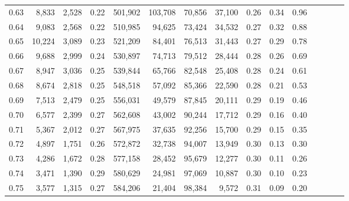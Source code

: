 \begin{tabular}{rrrcrrrrrrrrrrr}
0.63 &   8,833 &  2,528 &                                       0.22 &  501,902 &  103,708 &   70,856 &   37,100 &  0.26 &  0.34 &                         0.96 \\
0.64 &   9,083 &  2,568 &                                       0.22 &  510,985 &   94,625 &   73,424 &   34,532 &  0.27 &  0.32 &                         0.88 \\
0.65 &  10,224 &  3,089 &                                       0.23 &  521,209 &   84,401 &   76,513 &   31,443 &  0.27 &  0.29 &                         0.78 \\
0.66 &   9,688 &  2,999 &                                       0.24 &  530,897 &   74,713 &   79,512 &   28,444 &  0.28 &  0.26 &                         0.69 \\
0.67 &   8,947 &  3,036 &                                       0.25 &  539,844 &   65,766 &   82,548 &   25,408 &  0.28 &  0.24 &                         0.61 \\
0.68 &   8,674 &  2,818 &                                       0.25 &  548,518 &   57,092 &   85,366 &   22,590 &  0.28 &  0.21 &                         0.53 \\
0.69 &   7,513 &  2,479 &                                       0.25 &  556,031 &   49,579 &   87,845 &   20,111 &  0.29 &  0.19 &                         0.46 \\
0.70 &   6,577 &  2,399 &                                       0.27 &  562,608 &   43,002 &   90,244 &   17,712 &  0.29 &  0.16 &                         0.40 \\
0.71 &   5,367 &  2,012 &                                       0.27 &  567,975 &   37,635 &   92,256 &   15,700 &  0.29 &  0.15 &                         0.35 \\
0.72 &   4,897 &  1,751 &                                       0.26 &  572,872 &   32,738 &   94,007 &   13,949 &  0.30 &  0.13 &                         0.30 \\
0.73 &   4,286 &  1,672 &                                       0.28 &  577,158 &   28,452 &   95,679 &   12,277 &  0.30 &  0.11 &                         0.26 \\
0.74 &   3,471 &  1,390 &                                       0.29 &  580,629 &   24,981 &   97,069 &   10,887 &  0.30 &  0.10 &                         0.23 \\
0.75 &   3,577 &  1,315 &                                       0.27 &  584,206 &   21,404 &   98,384 &    9,572 &  0.31 &  0.09 &                         0.20 \\

\end{tabular}
